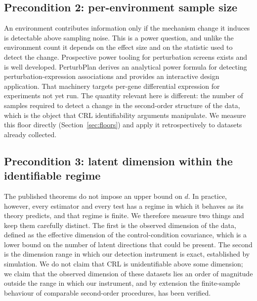 \documentclass[journal,twoside,web]{ieeecolor}
\begin{document}
\subsection{Precondition 2: per-environment sample size}
An environment contributes information only if the mechanism change it induces
is detectable above sampling noise. This is a power question, and unlike the
environment count it depends on the effect size and on the statistic used to
detect the change. Prospective power tooling for perturbation screens exists
and is well developed. PerturbPlan \cite{niu2026} derives an analytical power
formula for detecting perturbation-expression associations and provides an
interactive design application. That machinery targets per-gene differential
expression for experiments not yet run. The quantity relevant here is
different: the number of samples required to detect a change in the
second-order structure of the data, which is the object that CRL
identifiability arguments manipulate. We measure this floor directly
(Section~\ref{sec:floors}) and apply it retrospectively to datasets already
collected.

\subsection{Precondition 3: latent dimension within the identifiable regime}
The published theorems do not impose an upper bound on $d$. In practice,
however, every estimator and every test has a regime in which it behaves as
its theory predicts, and that regime is finite. We therefore measure two
things and keep them carefully distinct. The first is the observed dimension
of the data, defined as the effective dimension of the control-condition
covariance, which is a lower bound on the number of latent directions that
could be present. The second is the dimension range in which our detection
instrument is exact, established by simulation. We do not claim that CRL is
unidentifiable above some dimension; we claim that the observed dimension of
these datasets lies an order of magnitude outside the range in which our
instrument, and by extension the finite-sample behaviour of comparable
second-order procedures, has been verified.
\end{document}
